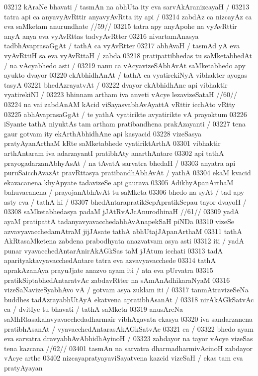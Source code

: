 03212 kAraNe bhavati / tasmAn na abhUta ity eva sarvAkAranizcayaH /  
03213 	tatra api ca anyavyAvRttir anyavyAvRtta ity api /
03214 	zabdAz ca nizcayAz ca eva saMketam anurundhate //59//  
03215 tatra apy anyApohe na vyAvRttir anyA anya eva vyAvRttas  tadvyAvRtter
03216 nivartamAnasya tadbhAvaprasaGgAt / tathA ca vyAvRtter  
03217 abhAvaH / tasmAd yA eva vyAvRttiH sa eva vyAvRttaH / zabda 
03218 pratipattibhedas tu saMketabhedAt / na vAcyabhedo asti / 
03219 nanu ca vAcyavizeSAbhAvAt saMketabhedo apy ayukto dvayor  
03220 ekAbhidhAnAt / tathA ca vyatirekiNyA vibhakter ayogas tasyA  
03221 bhedAzrayatvAt /
03222 	dvayor ekAbhidhAne api vibhaktir vyatirekiNI / 
03223 	bhinnam artham iva anveti vAcye lezavizeSataH //60//
03224 na vai zabdAnAM kAcid viSayasvabhAvAyattA vRttir icchAto vRtty 
03225 abhAvaprasaGgAt / te yathA vyatirikte avyatirikte vA prayoktum 
03226 iSyante tathA niyuktAs tam artham pratibandhena prakAzayanti /
03227 tena gaur gotvam ity ekArthAbhidhAne api kasyacid  
03228 vizeSasya pratyAyanArthaM kRte saMketabhede vyatiriktArthA
03301 vibhaktir arthAntaram iva adarzayantI pratibhAty anarthAntare 
03302 api tathA prayogadarzanAbhyAsAt / na tAvatA sarvatra bhedaH /  
03303 anyatra api puruSaicchAvazAt pravRttasya pratibandhAbhAvAt / yathA
03304 ekaM kvacid ekavacanena khyApyate tadavizeSe api gaurava  
03305 AdikhyApanArthaM bahuvacanena / prayojanAbhAvAt tu  saMketa 
03306 bhedo na syAt / tad apy asty eva / tathA hi /
03307 	bhedAntarapratikSepApratikSepau tayor dvayoH /
03308 	saMketabhedasya padaM jJAtRvAJcAnurodhinaH //61// 
03309 yadA ayaM pratipattA tadanyavyavacchedabhAvAnapekSaH piNDa 
03310 vizeSe azvavyavacchedamAtraM jijJAsate tathA abhUtajJApanArthaM 
03311 tathA AkRtasaMketena zabdena prabodhyata anazvatvam asya asti 
03312 iti / yadA punar vyavacchedAntarAnirAkAGkSas taM jJAtum icchati
03313 tadA aparityaktavyavacchedAntare tatra eva azvavyavacchede  
03314 tathA aprakAzanAya prayuJjate anazvo ayam iti / ata eva pUrvatra
03315 pratikSiptabhedAntaratvAc zabdavRtter na sAmAnAdhikaraNyaM  
03316 vizeSaNavizeSyabhAvo vA / gotvam asya zuklam iti / 
03317 tanmAtravizeSeNa buddhes tadAzrayabhUtAyA ekatvena apratibhAsanAt /
03318 nirAkAGkSatvAc ca / dvitIye tu bhavati / tathA saMketa  
03319 anusAreNa saMhRtasakalavyavacchedadharmair vibhAgavata ekasya  
03320 iva sandarzanena pratibhAsanAt / vyavacchedAntarasAkAGkSatvAc  
03321 ca / 
03322 	bhedo ayam eva sarvatra dravyabhAvAbhidhAyinoH / 
03323 	zabdayor na tayor vAcye vizeSas tena kazcana //62//  
03401 tasmAn na sarvatra dharmadharmivAcinoH zabdayor vAcye arthe 
03402 nizcayapratyayaviSayatvena kazcid vizeSaH / ekas tam eva pratyAyayan
